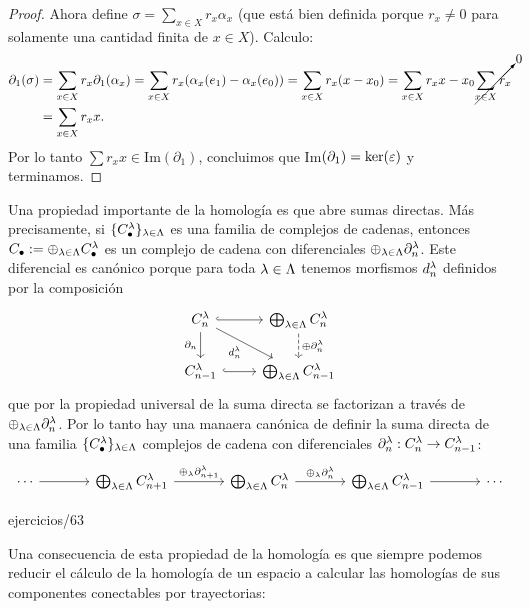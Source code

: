 \documentclass[../../topologia_algebraica]{subfiles}
\begin{document}
\begin{proof}
  Ahora define $\sigma=\sum_{x\in X} r_x \alpha_x$ (que est\'a bien definida porque $r_x\neq 0$
  para solamente una cantidad finita de $x\in X$). Calculo:
  \begin{align*}
    \partial_1(\sigma)& =\sum_{x\in X} r_x \partial_1(\alpha_x)=
    \sum_{x\in X} r_x(\alpha_x(e_1)-\alpha_x(e_0))=\sum_{x\in X} r_x(x-x_0)=
    \sum_{x\in X} r_x x -x_0\cancelto{0}{\sum_{x\in X} r_x}\\ &=\sum_{x\in X} r_x x.
  \end{align*}
  Por lo tanto $\sum r_x x\in$Im$(\partial_1)$, concluimos que Im$(\partial_1)=\ker(\varepsilon)$ y terminamos.
\end{proof}

Una propiedad importante de la homolog\'ia es que abre sumas directas. M\'as precisamente, si
$\{C_{\bullet}^{\lambda}\}_{\lambda\in\Lambda}$ es una familia de complejos de cadenas, entonces
$C_{\bullet}:=\oplus_{\lambda\in\Lambda}C_{\bullet}^{\lambda}$ es un complejo de cadena con diferenciales
$\oplus_{\lambda\in\Lambda}\partial_n^{\lambda}$. Este diferencial es can\'onico porque para toda $\lambda\in \Lambda$
tenemos morfismos $d_{n}^{\lambda}$ definidos por la composici\'on
\[
  \begin{tikzcd}
    C_n^{\la} \arrow[d,"\partial_n"'] \arrow[dr,"d_n^{\la}"']  \arrow[r,hookrightarrow] &%
    \bigoplus_{\la\in\Lambda}C_n^{\la} \arrow[d,dashed,"\oplus \partial_n^{\la}"]\\
    C_{n-1}^{\la} \arrow[r,hookrightarrow] & \bigoplus_{\la\in\Lambda}C_{n-1}^{\la}
  \end{tikzcd}
\]
que por la propiedad universal de la suma directa se factorizan a trav\'es de
$\oplus_{\lambda\in\Lambda}\partial_n^{\lambda}$. Por lo tanto hay una manaera can\'onica de definir
la suma directa de una familia $\{C_{\bullet}^{\lambda}\}_{\lambda\in\Lambda}$ complejos de cadena con
diferenciales $\partial_n^{\lambda}:C_n^{\lambda}\rightarrow C_{n-1}^{\lambda}$:
\[
  \begin{tikzcd}[column sep=large]
    \cdots \arrow[r] & \bigoplus_{\la\in\Lambda}C_{n+1}^{\la} \arrow[r,"\oplus_{\la} \partial_{n+1}^{\la}"] & %
    \bigoplus_{\la\in\Lambda}C_{n}^{\la} \arrow[r,"\oplus_{\la} \partial_{n}^{\la}"] & %
    \bigoplus_{\la\in\Lambda}C_{n-1}^{\la}  \arrow[r] & \cdots
  \end{tikzcd}
\]

{ejercicios/63} %

Una consecuencia de esta propiedad de la homolog\'ia es que siempre podemos reducir el c\'alculo de la
homolog\'ia de un espacio a calcular las homolog\'ias de sus componentes conectables por trayectorias:
\end{document}

